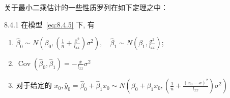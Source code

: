 关于最小二乘估计的一些性质罗列在如下定理之中：
\begin{theorem}{}{8.4.1}
在模型~\ref{eq:8.4.5} 下, 有
\begin{enumerate}
  \item  $\hat{\beta}_{0} \sim N \left(\beta_{0}, \left(\frac{1}{n} + \frac{\bar{x}^{2}}{l_{xx}} \right) \sigma^{2}\right), \quad \hat{\beta}_{1} \sim N \left(\beta_{1}, \frac{\sigma^{2}}{l_{xx}} \right)$;
  \item ${\operatorname{Cov}\left(\hat{\beta}_{0}, \hat{\beta}_{1}\right)=-\frac{\bar{x}}{l_{x x}} \sigma^{2}}$
  \item 对于给定的  $x_{0}, \hat{y}_{0}=\hat{\beta}_{0}+\hat{\beta}_{1} x_{0} \sim N\left(\beta_{0}+\beta_{1} x_{0},\left(\frac{1}{n}+\frac{\left(x_{0}-\bar{x}\right)^{2}}{l_{x x}}\right) \sigma^{2}\right) $ 
\end{enumerate}


\end{theorem}
